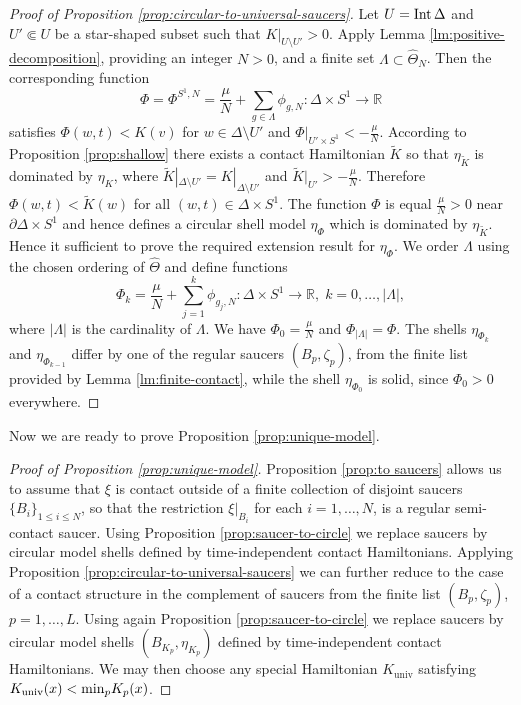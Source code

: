 \documentclass[12pt]{paper}
\theoremstyle{plain}
\theoremstyle{definition}
\newcommand{\wt}{\widetilde}
\newcommand{\wh}{\widehat}
\newcommand{\p}{\partial}
\newcommand{\R}{{\mathbb{R}}}
\newcommand{\Int}{{\rm Int\,}} %
\renewcommand{\min}{{\rm min}}
\newcommand{\univ}{\mathrm{univ}}
\numberwithin{figure}{section}
\begin{document}
  
  \begin{proof}[Proof of Proposition \ref{prop:circular-to-universal-saucers}]
  Let $U=\Int \Delta$ and $U'\Subset U$ be a star-shaped subset such that $K|_{U\setminus U'}>0$. Apply Lemma \ref{lm:positive-decomposition}, providing   an integer $N>0$, and a finite set $\Lambda\subset\wh\Theta_N$.
 Then the corresponding  function 
$$\Phi=\Phi^{S^1,N}=\frac\mu N+\sum\limits_{g\in \Lambda}\phi_{g,N} :\Delta\times S^1\to\R$$ satisfies
 $\Phi (w,t)< K(v)$ for $w\in \Delta\setminus U'$ and $\Phi|_{U'\times S^1}<-\frac\mu N$.   According to Proposition  \ref{prop:shallow} there exists a contact Hamiltonian $\wt K$ so that $\eta_{\wt K}$ is dominated by $\eta_K$,
 where $\wt K|_{\Delta\setminus U'}=K|_{\Delta\setminus U'}$  and $\wt K|_{U'}>-\frac\mu N$. Therefore $\Phi(w,t)<\wt K(w)$ for all $(w,t) \in \Delta \times S^1$.
 The function $\Phi$ is equal $\frac\mu N>0$ near $\p \Delta\times S^1$ and hence defines a circular shell model $\eta_{\Phi}$ which is dominated by $\eta_{\wt K}$. Hence it sufficient to prove the required extension result for $\eta_{\Phi}$.  We order $\Lambda$ using the chosen ordering of $\wh\Theta$ and  define functions 
 $$\Phi_k= \frac\mu N+\sum\limits_{j=1}^k \phi_{g_j,N}:\Delta\times S^1\to\R,\; k=0,\dots,|\Lambda|,$$ where $|\Lambda|$ is the cardinality of $\Lambda$.
 We have $\Phi_0=\frac\mu N$ and $\Phi_{|\Lambda|}=\Phi$. The  shells $\eta_{\Phi_k}$ and 
 $\eta_{\Phi_{k-1}}$ differ by one of the  regular saucers $(B_p,\zeta_p)$, from the finite list provided by Lemma \ref{lm:finite-contact}, while the    shell $\eta_{\Phi_0}$ is solid, since $\Phi_0>0$ everywhere.   
 \end{proof}

 Now we are ready to prove Proposition \ref{prop:unique-model}.
\begin{proof}[Proof of Proposition \ref{prop:unique-model}]
 Proposition  \ref{prop:to saucers} allows us to   assume that $\xi$ is contact outside of a finite collection of disjoint saucers  $\{B_i\}_{1\leq i\leq N}$, so that the restriction  $\xi|_{B_i}$ for each $i=1,\dots, N$, is a regular semi-contact saucer.  Using Proposition \ref{prop:saucer-to-circle} we replace saucers by
  circular model shells  defined  by time-independent contact Hamiltonians.
  Applying
Proposition \ref{prop:circular-to-universal-saucers}
  we   can further reduce to the case of a contact structure 
  in the complement of saucers from the finite list  $(B_p,\zeta_p)$, $p=1,\dots, L$.  Using again  Proposition \ref{prop:saucer-to-circle} we replace saucers by
  circular model shells $\left(B_{K_p},\eta_{K_p}\right)$ defined  by time-independent contact Hamiltonians.  We may then choose any special Hamiltonian $K_\univ$ satisfying $K_\univ(x) < \min_p K_p(x)$.
  \end{proof}
\end{document}
